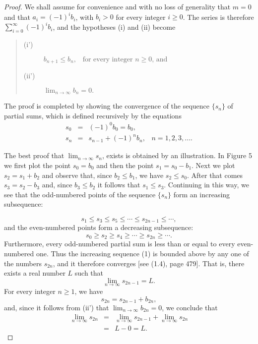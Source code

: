 \begin{proof}
We shall assume for convenience and with no loss of generality that $m = 0$ and that $a_i = (-1)^{i} b_i$, with $b_i > 0$ for every integer $i \geq 0$. The series is therefore $\sum_{i=0}^\infty (-1)^{i} b_i$, and the hypotheses (i) and (ii) become
\begin{quote}
\begin{description}
\item[(i')] $b_{n + 1} \leq b_n, \;\;\; \mbox{for every integer $n \geq 0$, and}$  
\item[(ii')] $\lim_{n \rightarrow \infty} b_n = 0.$
\end{description}
\end{quote}
The proof is completed by showing the convergence of the sequence $\{s_n \}$ of partial sums, which is defined recursively by the equations
\begin{eqnarray*}
s_0 &=& (-1)^0 b_0= b_0,\\
s_n &=& s_{n-1} + ( - 1 )^n b_n, \;\;\; n  = 1, 2, 3, ....  
\end{eqnarray*}

The best proof that $\lim_{n \rightarrow \infty} s_n$, exists is obtained by an illustration. In Figure 5 we first plot the point $s_0 = b_0$ and then the point $s_1 = s_0 - b_1$. Next we
plot $s_2 = s_1 + b_2$ and observe that, since $b_2 \leq b_1$, we have $s_2 \leq s_0$. After that comes $s_3 = s_2 - b_3$ and, since $b_3 \leq b_2$ it follows that $s_1 \leq s_3$. Continuing in this way, we see that the odd-numbered points of the sequence $\{s_n\}$ form an increasing subsequence:



\begin{equation}
s_1 \leq s_3 \leq s_5 \leq \cdots \leq s_{2n-1} \leq \cdots,  
\label{eq9.4.1}
\end{equation}
and the even-numbered points form a decreasing subsequence:
$$
s_0 \geq s_2 \geq s_4 \geq \cdots \geq s_{2n} \geq \cdots.
$$
Furthermore, every odd-numbered partial sum is less than or equal to every even-numbered one. Thus the increasing sequence (1) is bounded above by any one of the numbers $s_{2n}$, and it therefore converges [see (1.4), page 479]. That is, there exists a real number $L$ such that 
$$
\lim_{n \rightarrow \infty}  s_{2n - 1} = L.  
$$
For every integer $n \geq 1$, we have
$$
s_{2n} = s_{2n - 1} + b_{2n}, 
$$
and, since it follows from (ii') that $\lim_{n \rightarrow \infty}  b_{2n} = 0$, we conclude that 
\begin{eqnarray*}
\lim_{n \rightarrow \infty}  s_{2n}  &=& \lim_{n \rightarrow \infty}  s_{2n - 1}  + \lim_{n \rightarrow \infty}  s_{2n}  \\
                                                     &=&  L - 0 = L.
\end{eqnarray*}


\end{proof}
